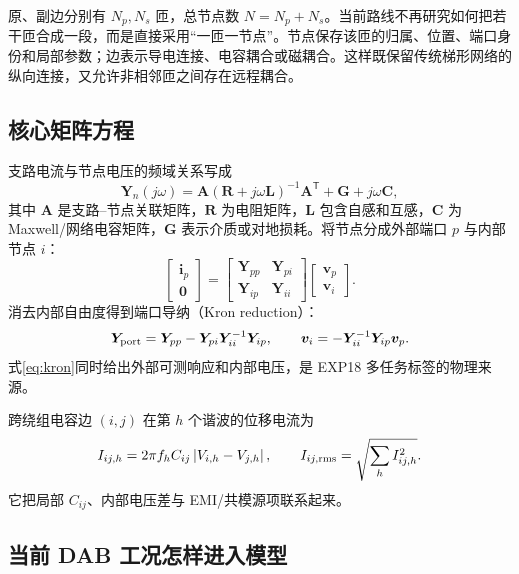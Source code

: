 \documentclass[UTF8,11pt,a4paper]{ctexart}
\newcommand{\mat}[1]{\bm{#1}}
\begin{document}
原、副边分别有 $N_p,N_s$ 匝，总节点数 $N=N_p+N_s$。当前路线不再研究如何把若干匝合成一段，而是直接采用“一匝一节点”。节点保存该匝的归属、位置、端口身份和局部参数；边表示导电连接、电容耦合或磁耦合。这样既保留传统梯形网络的纵向连接，又允许非相邻匝之间存在远程耦合。

\subsection{核心矩阵方程}

支路电流与节点电压的频域关系写成
\begin{equation}
 \mat Y_n(j\omega)=
 \mat A(\mat R+j\omega\mat L)^{-1}\mat A^{\mathsf T}
 +\mat G+j\omega\mat C,
 \label{eq:yn}
\end{equation}
其中 $\mat A$ 是支路--节点关联矩阵，$\mat R$ 为电阻矩阵，$\mat L$ 包含自感和互感，$\mat C$ 为 Maxwell/网络电容矩阵，$\mat G$ 表示介质或对地损耗。将节点分成外部端口 $p$ 与内部节点 $i$：
\begin{equation}
\begin{bmatrix}\mat i_p\\\mat 0\end{bmatrix}=
\begin{bmatrix}\mat Y_{pp}&\mat Y_{pi}\\\mat Y_{ip}&\mat Y_{ii}\end{bmatrix}
\begin{bmatrix}\mat v_p\\\mat v_i\end{bmatrix}.
\end{equation}
消去内部自由度得到端口导纳（Kron reduction）：
\begin{equation}
 \mat Y_{\rm port}=\mat Y_{pp}-\mat Y_{pi}\mat Y_{ii}^{-1}\mat Y_{ip},
 \qquad
 \mat v_i=-\mat Y_{ii}^{-1}\mat Y_{ip}\mat v_p.
 \label{eq:kron}
\end{equation}
式\eqref{eq:kron}同时给出外部可测响应和内部电压，是 EXP18 多任务标签的物理来源。

跨绕组电容边 $(i,j)$ 在第 $h$ 个谐波的位移电流为
\begin{equation}
 I_{ij,h}=2\pi f_h C_{ij}\left|V_{i,h}-V_{j,h}\right|,
 \qquad I_{ij,\rm rms}=\sqrt{\sum_h I_{ij,h}^2}.
 \label{eq:iedge}
\end{equation}
它把局部 $C_{ij}$、内部电压差与 EMI/共模源项联系起来。

\subsection{当前 DAB 工况怎样进入模型}
\end{document}
